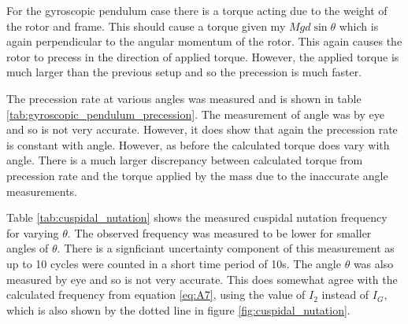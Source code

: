 \documentclass[8pt]{article}
\begin{document}


For the gyroscopic pendulum case there is a torque acting due to the weight of the rotor and frame.
This should cause a torque given my $Mgd \sin \theta$ which is again perpendicular to the angular momentum of the rotor.
This again causes the rotor to precess in the direction of applied torque. However, the applied torque is much larger than
the previous setup and so the precession is much faster.




The precession rate at various angles was measured and is shown in table \ref{tab:gyroscopic_pendulum_precession}.
The measurement of angle was by eye and so is not very accurate. However, it does show that again the precession rate is constant with angle.
However, as before the calculated torque does vary with angle. There is a much larger discrepancy between calculated torque from precession rate
and the torque applied by the mass due to the inaccurate angle measurements.




Table \ref{tab:cuspidal_nutation} shows the measured cuspidal nutation frequency for varying $\theta$.
The observed frequency was measured to be lower for smaller angles of $\theta$.
There is a signficiant uncertainty component of this measurement as up to 10 cycles were counted in a short time period of 10s.
The angle $\theta$ was also measured by eye and so is not very accurate.
This does somewhat agree with the calculated frequency from equation \ref{eq:A7}, using the value of $I_2$ instead of $I_G$,
which is also shown by the dotted line in figure \ref{fig:cuspidal_nutation}.


\end{document}
